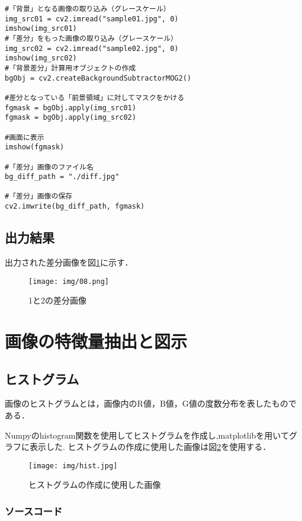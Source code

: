 \documentclass{article}
\begin{document}
\begin{lstlisting}
#「背景」となる画像の取り込み（グレースケール）
img_src01 = cv2.imread("sample01.jpg", 0)
imshow(img_src01)
#「差分」をもった画像の取り込み（グレースケール）
img_src02 = cv2.imread("sample02.jpg", 0)
imshow(img_src02)
#「背景差分」計算用オブジェクトの作成　
bgObj = cv2.createBackgroundSubtractorMOG2()

#差分となっている「前景領域」に対してマスクをかける
fgmask = bgObj.apply(img_src01)
fgmask = bgObj.apply(img_src02)

#画面に表示
imshow(fgmask)

#「差分」画像のファイル名
bg_diff_path = "./diff.jpg"

#「差分」画像の保存
cv2.imwrite(bg_diff_path, fgmask)

\end{lstlisting}

\subsection{出力結果}

出力された差分画像を図\ref{08}に示す．

\begin{figure}[H]
\centering
\texttt{[image: img/08.png]}
\caption{1と2の差分画像}
\label{08}
\end{figure}

\section{画像の特徴量抽出と図示}

\subsection{ヒストグラム}

画像のヒストグラムとは，画像内のR値，B値，G値の度数分布を表したものである．

Numpyのhistogram関数を使用してヒストグラムを作成し,matplotlibを用いてグラフに表示した.
ヒストグラムの作成に使用した画像は図\ref{hist}を使用する．


\begin{figure}[H]
    \centering
    \texttt{[image: img/hist.jpg]}
    \caption{ヒストグラムの作成に使用した画像}
    \label{hist}
    \end{figure}
\subsubsection{ソースコード}
\end{document}
